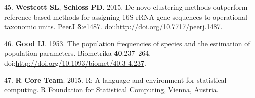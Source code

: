 \documentclass[11pt,]{article}
\begin{document}
45. \textbf{Westcott SL}, \textbf{Schloss PD}. 2015. De novo clustering
methods outperform reference-based methods for assigning 16S rRNA gene
sequences to operational taxonomic units. PeerJ \textbf{3}:e1487.
doi:\url{http://doi.org/10.7717/peerj.1487}.

46. \textbf{Good IJ}. 1953. The population frequencies of species and
the estimation of population parameters. Biometrika
\textbf{40}:237--264.
doi:\url{http://doi.org/10.1093/biomet/40.3-4.237}.

47. \textbf{R Core Team}. 2015. R: A language and environment for
statistical computing. R Foundation for Statistical Computing, Vienna,
Austria.
\end{document}
